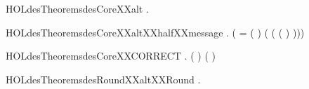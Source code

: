 \newcommand{\HOLdesTheoremsdesCoreXXZero}{\UseVerbatim{HOLdesTheoremsdesCoreXXZero}}
\begin{SaveVerbatim}{HOLdesTheoremsdesCoreXXalt}
\HOLTokenTurnstile{} \HOLSymConst{\HOLTokenForall{}} .
      \HOLSymConst{\HOLTokenLt{}}  \HOLSymConst{\HOLTokenImp{}}
        \HOLSymConst{=}  \HOLConst{\HOLTokenCompose}  \HOLConst{\HOLTokenCompose}  \HOLConst{\HOLTokenCompose}    \HOLConst{\HOLTokenCompose}  \HOLConst{\HOLTokenCompose} 
\end{SaveVerbatim}
\newcommand{\HOLdesTheoremsdesCoreXXalt}{\UseVerbatim{HOLdesTheoremsdesCoreXXalt}}
\begin{SaveVerbatim}{HOLdesTheoremsdesCoreXXaltXXhalfXXmessage}
\HOLTokenTurnstile{} \HOLSymConst{\HOLTokenForall{}}  .
      \HOLSymConst{\HOLTokenLt{}}  \HOLSymConst{\HOLTokenImp{}}
         \HOLSymConst{=}
     (
         =  ( )
          (
             (    ( )\HOLSymConst{,}
                  )))
\end{SaveVerbatim}
\newcommand{\HOLdesTheoremsdesCoreXXaltXXhalfXXmessage}{\UseVerbatim{HOLdesTheoremsdesCoreXXaltXXhalfXXmessage}}
\begin{SaveVerbatim}{HOLdesTheoremsdesCoreXXCORRECT}
\HOLTokenTurnstile{} \HOLSymConst{\HOLTokenForall{}}  .
       \HOLSymConst{=}  \HOLSymConst{\HOLTokenImp{}}
       ( ) (   ) \HOLSymConst{=}
\end{SaveVerbatim}
\newcommand{\HOLdesTheoremsdesCoreXXCORRECT}{\UseVerbatim{HOLdesTheoremsdesCoreXXCORRECT}}
\begin{SaveVerbatim}{HOLdesTheoremsdesRoundXXaltXXRound}
\HOLTokenTurnstile{} \HOLSymConst{\HOLTokenForall{}}   .  \HOLSymConst{\HOLTokenLt{}}  \HOLSymConst{\HOLTokenImp{}}      \HOLSymConst{=}    
\end{SaveVerbatim}
